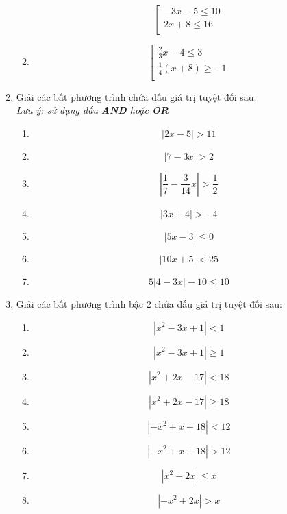 \documentclass{article}
\begin{document}
\begin{enumerate}[start=1,label={\bfseries Bài tập \arabic*:},leftmargin=1in]
\begin{enumerate}
\begin{equation*}
        \left[\begin{array}{l}
        -3x-5\leq10\\
        2x+8\leq16\\
        \end{array}\right.
    \end{equation*}
    \item \begin{equation*}
        \left[\begin{array}{l}
        \frac{2}{3}x-4\leq3\\
        \frac{1}{4}\left(x+8\right)\geq-1\\
        \end{array}\right.
    \end{equation*}
\end{enumerate}
\item Giải các bất phương trình chứa dấu giá trị tuyệt đối sau:
\\ \textit{Lưu ý: sử dụng dấu \textbf{AND} hoặc \textbf{OR}}
\begin{enumerate}
    \item $$|2x-5|>11$$
    \item $$|7-3x|>2$$
    \item $$\left|\frac{1}{7}-\frac{3}{14}x\right|>\frac{1}{2}$$
    \item $$|3x+4|>-4$$
    \item $$|5x-3|\leq0$$
    \item $$|10x+5|<25$$
    \item $$5|4-3x|-10\leq10$$
\end{enumerate}
\newpage
\item{Giải các bất phương trình bậc 2 chứa dấu giá trị tuyệt đối sau:}
\begin{enumerate}
    \item $$|x^2-3x+1|<1$$
    \item $$|x^2-3x+1|\geq 1$$
    \item $$|x^2+2x-17|<18$$
    \item $$|x^2+2x-17|\geq 18$$
    \item $$|-x^2+x+18|<12$$
    \item $$|-x^2+x+18|>12$$
    \item $$|x^2-2x|\leq x$$
    \item $$|-x^2+2x|>x$$
\end{enumerate}
\end{enumerate}
\end{document}
